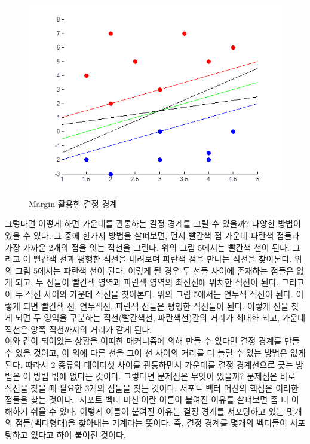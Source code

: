 \documentclass[a4paper]{oblivoir}
\begin{document}
\begin{figure}[ht]\centering
\includegraphics[scale=0.5]{Decision_withmargin}\caption{Margin 활용한 결정 경계}\label{Fig:5-5}
\end{figure}
\indent 그렇다면 어떻게 하면 가운데를 관통하는 결정 경계를 그릴 수 있을까? 다양한 방법이 있을 수 있다. 그 중에 한가지 방법을 살펴보면, 먼저 빨간색 점 가운데 파란색 점들과 가장 가까운 2개의 점을 잇는 직선을 그린다. 위의 그림 5에서는 빨간색 선이 된다. 그리고 이 빨간색 선과 평행한 직선을 내려보며 파란색 점을 만나는 직선을 찾아본다. 위의 그림 5에서는 파란색 선이 된다. 이렇게 될 경우 두 선들 사이에 존재하는 점들은 없게 되고, 두 선들이 빨간색 영역과 파란색 영역의 최전선에 위치한 직선이 된다. 그리고 이 두 직선 사이의 가운데 직선을 찾아본다. 위의 그림 5에서는 연두색 직선이 된다. 이렇게 되면 빨간색 선, 연두색선, 파란색 선들은 평행한 직선들이 된다. 이렇게 선을 찾게 되면 두 영역을 구분하는 직선(빨간색선, 파란색선)간의 거리가 최대화 되고, 가운데 직선은 양쪽 직선까지의 거리가 같게 된다.\\
\indent 이와 같이 되어있는 상황을 어떠한 매커니즘에 의해 만들 수 있다면 결정 경계를 만들 수 있을 것이고, 이 외에 다른 선을 그어 선 사이의 거리를 더 늘릴 수 있는 방법은 없게 된다. 따라서 2 종류의 데이터셋 사이를 관통하면서 가운데를 결정 경계선으로 긋는 방법은 이 방법 밖에 없다는 것이다. 그렇다면 문제점은 무엇이 있을까? 문제점은 바로 직선을 찾을 때 필요한 3개의 점들을 찾는 것이다. 서포트 벡터 머신의 핵심은 이러한 점들을 찾는 것이다. `서포트 벡터 머신'이란 이름이 붙여진 이유를 살펴보면 좀 더 이해하기 쉬울 수 있다. 이렇게 이름이 붙여진 이유는 결정 경계를 서포팅하고 있는 몇개의 점들(벡터형태)을 찾아내는 기계라는 뜻이다. 즉, 결정 경계를 몇개의 벡터들이 서포팅하고 있다고 하여 붙여진 것이다.\\
\end{document}
